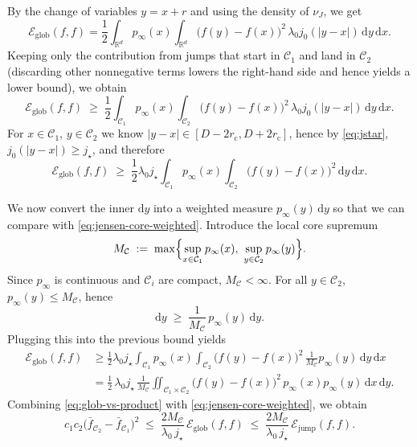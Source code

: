 By the change of variables \(y=x+r\) and using the density of \(\nu_J\), we get
\[
\mathcal E_{\mathrm{glob}}(f,f)
=
\frac12\int_{\mathbb R^d} p_\infty(x)\int_{\mathbb R^d}
\bigl(f(y)-f(x)\bigr)^2\,
\lambda_0 j_0(|y-x|)\,\mathrm dy\,\mathrm dx.
\]
Keeping only the contribution from jumps that start in \(\mathcal C_1\) and land in
\(\mathcal C_2\) (discarding other nonnegative terms lowers the right-hand side
and hence yields a lower bound), we obtain
\begin{equation}\label{eq:glob-lower-crosscore}
\mathcal E_{\mathrm{glob}}(f,f)
\;\ge\;
\frac12\int_{\mathcal C_1} p_\infty(x)\int_{\mathcal C_2}
\bigl(f(y)-f(x)\bigr)^2\,
\lambda_0 j_0(|y-x|)\,\mathrm dy\,\mathrm dx.
\end{equation}
For \(x\in\mathcal C_1\), \(y\in\mathcal C_2\) we know
\(|y-x|\in[D-2r_{\mathrm c},D+2r_{\mathrm c}]\), hence by \eqref{eq:jstar},
\(j_0(|y-x|)\ge j_\star\), and therefore
\[
\mathcal E_{\mathrm{glob}}(f,f)
\;\ge\;
\frac12\lambda_0 j_\star
\int_{\mathcal C_1} p_\infty(x)\int_{\mathcal C_2}
\bigl(f(y)-f(x)\bigr)^2\,\mathrm dy\,\mathrm dx.
\]

We now convert the inner \(\mathrm dy\) into a weighted measure \(p_\infty(y)\,\mathrm dy\)
so that we can compare with \eqref{eq:jensen-core-weighted}.
Introduce the local core supremum
\[
M_{\mathcal C}
\;:=\;
\max\Bigl\{\sup_{x\in\mathcal C_1}p_\infty(x),\ \sup_{y\in\mathcal C_2}p_\infty(y)\Bigr\}.
\]
Since \(p_\infty\) is continuous and \(\mathcal C_i\) are compact, \(M_{\mathcal C}<\infty\).
For all \(y\in\mathcal C_2\), \(p_\infty(y)\le M_{\mathcal C}\), hence
\[
\mathrm dy\;\ge\;\frac{1}{M_{\mathcal C}}\,p_\infty(y)\,\mathrm dy.
\]
Plugging this into the previous bound yields
\begin{align}
\mathcal E_{\mathrm{glob}}(f,f)
&\ge
\frac12\lambda_0 j_\star
\int_{\mathcal C_1} p_\infty(x)\int_{\mathcal C_2}
\bigl(f(y)-f(x)\bigr)^2\,\frac{1}{M_{\mathcal C}}p_\infty(y)\,\mathrm dy\,\mathrm dx
\nonumber\\
&=
\frac12\,\lambda_0 j_\star\,\frac{1}{M_{\mathcal C}}
\iint_{\mathcal C_1\times\mathcal C_2}
\bigl(f(y)-f(x)\bigr)^2\,
p_\infty(x)p_\infty(y)\,\mathrm dx\,\mathrm dy.
\label{eq:glob-vs-product}
\end{align}
Combining \eqref{eq:glob-vs-product} with \eqref{eq:jensen-core-weighted}, we obtain
\begin{equation}\label{eq:core-mean-controlled-by-jump}
c_1c_2\bigl(\bar f_{\mathcal C_2}-\bar f_{\mathcal C_1}\bigr)^2
\;\le\;
\frac{2M_{\mathcal C}}{\lambda_0\,j_\star}\,
\mathcal E_{\mathrm{glob}}(f,f)
\;\le\;
\frac{2M_{\mathcal C}}{\lambda_0\,j_\star}\,
\mathcal E_{\mathrm{jump}}(f,f).
\end{equation}

